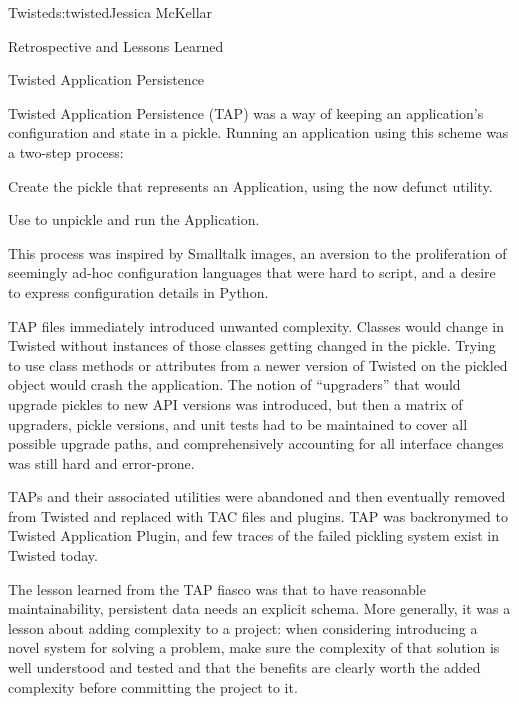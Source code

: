 \begin{aosachapter}{Twisted}{s:twisted}{Jessica McKellar}
\begin{aosasect1}{Retrospective and Lessons Learned}
\begin{aosasect2}{Twisted Application Persistence}

Twisted Application Persistence (TAP) was a way of keeping an application's
configuration and state in a pickle. Running an application using this scheme
was a two-step process:

\begin{aosaenumerate}

\item Create the pickle that represents an Application, using the now
  defunct  utility.

\item Use  to unpickle and run the Application.

\end{aosaenumerate}

This process was inspired by Smalltalk images, an aversion to the
proliferation of seemingly ad-hoc configuration languages that were hard to
script, and a desire to express configuration details in Python.

TAP files immediately introduced unwanted complexity. Classes would change in
Twisted without instances of those classes getting changed in the pickle. Trying
to use class methods or attributes from a newer version of Twisted on the
pickled object would crash the application. The notion of ``upgraders'' that would
upgrade pickles to new API versions was introduced, but then a matrix of
upgraders, pickle versions, and unit tests had to be maintained to cover all
possible upgrade paths, and comprehensively accounting for all interface changes
was still hard and error-prone.

TAPs and their associated utilities were abandoned and then eventually
removed from Twisted and replaced with TAC files and plugins. TAP was
backronymed to Twisted Application Plugin, and few traces of the failed pickling
system exist in Twisted today.

The lesson learned from the TAP fiasco was that to have reasonable
maintainability, persistent data needs an explicit schema. More generally, it
was a lesson about adding complexity to a project: when considering introducing
a novel system for solving a problem, make sure the complexity of that solution
is well understood and tested and that the benefits are clearly worth the added
complexity before committing the project to it.

\end{aosasect2}


\end{aosasect1}
\end{aosachapter}
